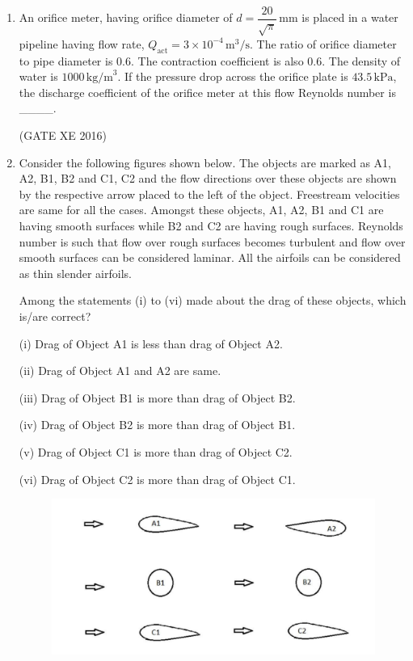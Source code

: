 \documentclass[12pt]{article}
\begin{document}
\begin{enumerate}
\begin{multicols}{4}
\begin{enumerate}
\item $1.8 \times 10^{-4}$
\item $1 \times 10^{-4}$
\item $1.8 \times 10^{-3}$
\item $9.1 \times 10^{-4}$
\end{enumerate}
\end{multicols}

(GATE XE 2016)

\item An orifice meter, having orifice diameter of $d = \dfrac{20}{\sqrt{\pi}} \, \text{mm}$ is placed in a water pipeline having flow rate, $Q_{\text{act}} = 3 \times 10^{-4} \, \text{m}^3/\text{s}$. The ratio of orifice diameter to pipe diameter is $0.6$. The contraction coefficient is also $0.6$. The density of water is $1000 \, \text{kg/m}^3$. If the pressure drop across the orifice plate is $43.5 \, \text{kPa}$, the discharge coefficient of the orifice meter at this flow Reynolds number is \_\_\_\_.  

(GATE XE 2016)

\item Consider the following figures shown below. The objects are marked as A1, A2, B1, B2 and C1, C2 and the flow directions over these objects are shown by the respective arrow placed to the left of the object. Freestream velocities are same for all the cases. Amongst these objects, A1, A2, B1 and C1 are having smooth surfaces while B2 and C2 are having rough surfaces. Reynolds number is such that flow over rough surfaces becomes turbulent and flow over smooth surfaces can be considered laminar. All the airfoils can be considered as thin slender airfoils.  

Among the statements (i) to (vi) made about the drag of these objects, which is/are correct?  


(i) Drag of Object A1 is less than drag of Object A2.

(ii) Drag of Object A1 and A2 are same.  

(iii) Drag of Object B1 is more than drag of Object B2.

(iv) Drag of Object B2 is more than drag of Object B1.  

(v) Drag of Object C1 is more than drag of Object C2.  

(vi) Drag of Object C2 is more than drag of Object C1.  

\begin{figure}[H]
    \centering
    \includegraphics[width=0.5\columnwidth]{figs/ass3_b_q19.png}
    \caption{}
    \label{fig:placeholder}
\end{figure}



\end{enumerate}
\end{document}
